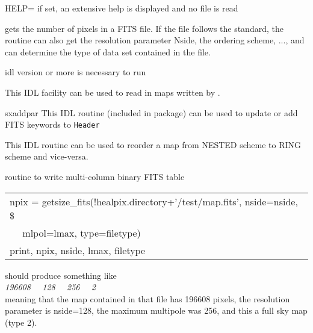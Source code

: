 \begin{keywords}
  \begin{kwlist}{} %
   \item[{HELP=}] if set, an extensive help is displayed and no
	file is read
   \end{kwlist}
\end{keywords}

\begin{codedescription}
{\facname gets the number of pixels in a FITS file. If the file
follows the \healpix standard, the routine can also get the resolution
parameter Nside, the ordering scheme, ..., and can determine the type
of data set contained in the file.}
\end{codedescription}



\begin{related}
  \begin{sulist}{} %
  \item[idl] version \idlversion or more is necessary to run \facname
  \item[\htmlref{read\_fits\_map}{idl:read_fits_map}] This \healpix IDL facility can be used to read in maps
  written by \facname.
  \item[sxaddpar] This IDL routine (included in \healpix package) can be used to update
  or add FITS keywords to {\tt Header}
  \item[\htmlref{reorder}{idl:reorder}] This \healpix IDL routine can be used to reorder a map from
  NESTED scheme to RING scheme and vice-versa.
  \item[\htmlref{write\_fits\_sb}{idl:write_fits_sb}] routine to write multi-column binary FITS table
  \end{sulist}
\end{related}


\begin{example}
{
\begin{tabular}{l} %
 npix = getsize\_fits(!healpix.directory+'/test/map.fits', nside=nside, \$ \\
$\quad$       mlpol=lmax, type=filetype)\\
 print, npix, nside, lmax, filetype
\end{tabular}
}
{\parbox[t]{\hsize}{ should produce something like \\
   {\em 196608 \ \        128 \ \         256  \ \      2} \\
meaning that the map contained in that file has 196608 pixels, the resolution parameter is
nside=128, the maximum multipole was 256, and this a full sky map
(type 2).
}}
\end{example}

